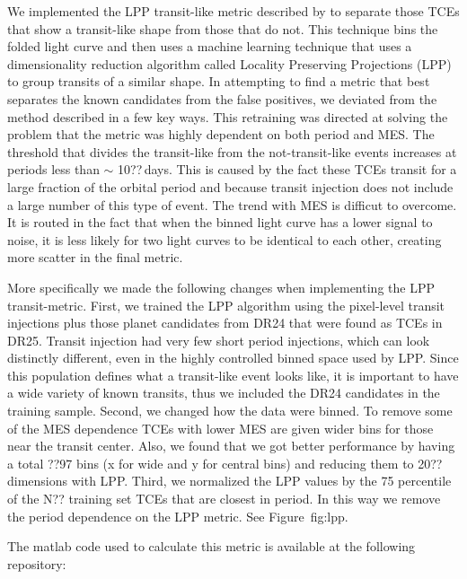 
We implemented the LPP transit-like metric described by \citet{Thompson2015b} to separate those TCEs that show a transit-like shape from those that do not. This technique bins the folded light curve and then uses a machine learning technique that uses a dimensionality reduction algorithm called Locality Preserving Projections (LPP) to group transits of a similar shape.  In attempting to find a metric that best separates the known candidates from the false positives, we deviated from the method described \citet{Thompson2015b} in a few key ways.  This retraining was directed at solving the problem that the metric was highly dependent on both period and MES. The threshold that divides the transit-like from the not-transit-like events increases at periods less than $\sim$ 10??\,days. This is caused by the fact these TCEs transit for a large fraction of the orbital period and because transit injection does not include a large number of this type of event.  The trend with MES is difficut to overcome. It is routed in the fact that when the binned light curve has a lower signal to noise, it is less likely for two light curves to be identical to each other, creating more scatter in the final metric.


More specifically we made the following changes when implementing the LPP transit-metric. First, we trained the LPP algorithm using the pixel-level transit injections plus those planet candidates from DR24 that were found as TCEs in DR25.  Transit injection had very few short period injections, which can look distinctly different, even in the highly controlled binned space used by LPP. Since this population defines what a transit-like event looks like, it is important to have a wide variety of known transits, thus we included the DR24 candidates in the training sample.  Second, we changed how the data were binned. To remove some of the MES dependence TCEs with lower MES are given wider bins for those near the transit center. Also, we found that we got better performance by having a total ??97 bins (x for wide and y for central bins) and reducing them to 20?? dimensions with LPP.  Third, we normalized the LPP values by the 75 percentile of the N?? training set TCEs that are closest in period.  In this way we remove the period dependence on the LPP metric.  See Figure~{fig:lpp}.

The matlab code used to calculate this metric is available at the following repository:
